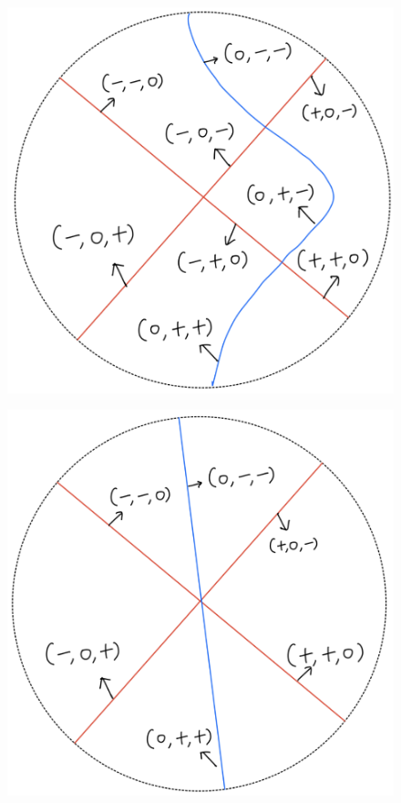 \begin{definition}
\begin{enumerate}
\begin{itemize}
\begin{figure}[H]
    \centering
    \includegraphics[scale = 0.45]{diagrams/lemma4/10.png}
    \caption{}
    \label{fig:your-label}
\end{figure}
\begin{figure}[H]
    \centering
    \includegraphics[scale = 0.45]{diagrams/lemma4/11.png}

\end{figure}
\end{itemize}
\end{enumerate}
\end{definition}
